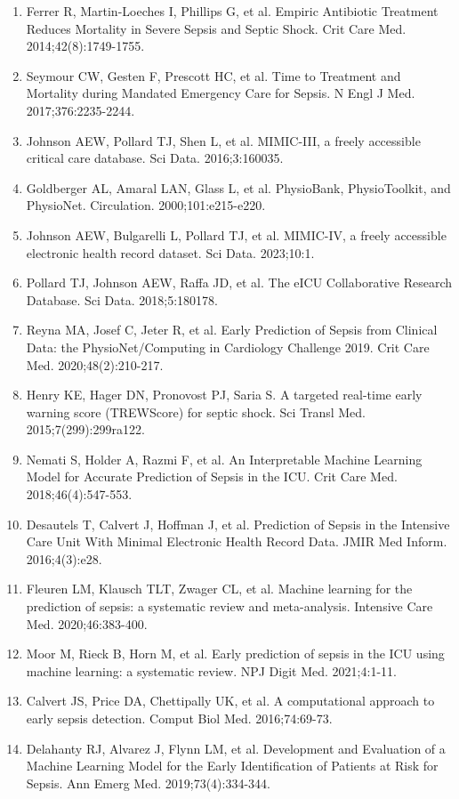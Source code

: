 \documentclass[11pt]{article}
\begin{document}
\begin{enumerate}
\item Ferrer R, Martin-Loeches I, Phillips G, et al. Empiric Antibiotic Treatment Reduces Mortality in Severe Sepsis and Septic Shock. Crit Care Med. 2014;42(8):1749-1755.
\item Seymour CW, Gesten F, Prescott HC, et al. Time to Treatment and Mortality during Mandated Emergency Care for Sepsis. N Engl J Med. 2017;376:2235-2244.
\item Johnson AEW, Pollard TJ, Shen L, et al. MIMIC-III, a freely accessible critical care database. Sci Data. 2016;3:160035.
\item Goldberger AL, Amaral LAN, Glass L, et al. PhysioBank, PhysioToolkit, and PhysioNet. Circulation. 2000;101:e215-e220.
\item Johnson AEW, Bulgarelli L, Pollard TJ, et al. MIMIC-IV, a freely accessible electronic health record dataset. Sci Data. 2023;10:1.
\item Pollard TJ, Johnson AEW, Raffa JD, et al. The eICU Collaborative Research Database. Sci Data. 2018;5:180178.
\item Reyna MA, Josef C, Jeter R, et al. Early Prediction of Sepsis from Clinical Data: the PhysioNet/Computing in Cardiology Challenge 2019. Crit Care Med. 2020;48(2):210-217.
\item Henry KE, Hager DN, Pronovost PJ, Saria S. A targeted real-time early warning score (TREWScore) for septic shock. Sci Transl Med. 2015;7(299):299ra122.
\item Nemati S, Holder A, Razmi F, et al. An Interpretable Machine Learning Model for Accurate Prediction of Sepsis in the ICU. Crit Care Med. 2018;46(4):547-553.
\item Desautels T, Calvert J, Hoffman J, et al. Prediction of Sepsis in the Intensive Care Unit With Minimal Electronic Health Record Data. JMIR Med Inform. 2016;4(3):e28.
\item Fleuren LM, Klausch TLT, Zwager CL, et al. Machine learning for the prediction of sepsis: a systematic review and meta-analysis. Intensive Care Med. 2020;46:383-400.
\item Moor M, Rieck B, Horn M, et al. Early prediction of sepsis in the ICU using machine learning: a systematic review. NPJ Digit Med. 2021;4:1-11.
\item Calvert JS, Price DA, Chettipally UK, et al. A computational approach to early sepsis detection. Comput Biol Med. 2016;74:69-73.
\item Delahanty RJ, Alvarez J, Flynn LM, et al. Development and Evaluation of a Machine Learning Model for the Early Identification of Patients at Risk for Sepsis. Ann Emerg Med. 2019;73(4):334-344.

\end{enumerate}
\end{document}
